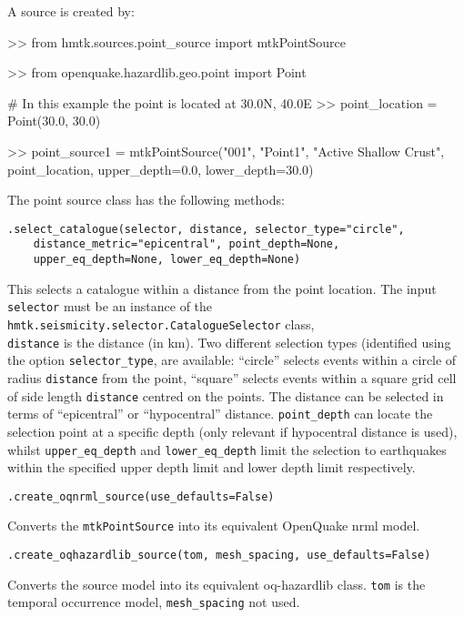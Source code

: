 A source is created by:

\begin{python}[frame=single]
>> from hmtk.sources.point_source import mtkPointSource

>> from openquake.hazardlib.geo.point import Point

# In this example the point is located at 30.0N, 40.0E
>> point_location = Point(30.0, 30.0)

>> point_source1 = mtkPointSource("001",
                                  "Point1",
                                  "Active Shallow Crust",
                                  point_location,
                                  upper_depth=0.0,
                                  lower_depth=30.0)
\end{python}

The point source class has the following methods:

\verb;.select_catalogue(selector, distance, selector_type="circle",;\\
\verb;    distance_metric="epicentral", point_depth=None,;\\
\verb;    upper_eq_depth=None, lower_eq_depth=None);

This selects a catalogue within a distance from the point location. The input \verb=selector= must be an instance of the \verb=hmtk.seismicity.selector.CatalogueSelector= class, \\ \verb=distance= is the distance (in km). Two different selection types (identified using the option \verb=selector_type=, are available: ``circle'' selects events within a circle of radius \verb=distance= from the point, ``square'' selects events within a square grid cell of side length \verb=distance= centred on the points. The distance can be selected in terms of ``epicentral'' or ``hypocentral'' distance. \verb=point_depth= can locate the selection point at a specific depth (only relevant if hypocentral distance is used), whilst \verb=upper_eq_depth= and \verb=lower_eq_depth= limit the selection to earthquakes within the specified upper depth limit and lower depth limit respectively. 


\verb;.create_oqnrml_source(use_defaults=False);

Converts the \verb=mtkPointSource= into its equivalent OpenQuake nrml model.

\verb;.create_oqhazardlib_source(tom, mesh_spacing, use_defaults=False);

Converts the source model into its equivalent oq-hazardlib class. \verb=tom= is the temporal occurrence model, \verb=mesh_spacing= not used.

